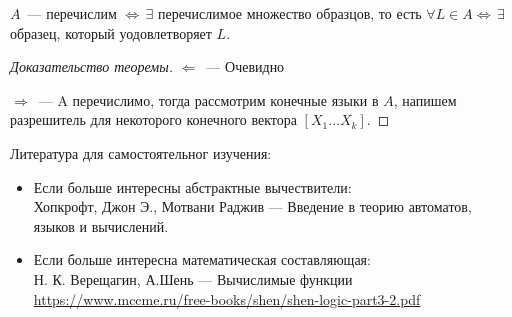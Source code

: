 \begin{theorem}
    $A$~--- перечислим $\iff \, \exists$ перечислимое множество образцов, то есть $\forall L \in A \iff \, \exists$ образец, который уодовлетворяет $L$.
\end{theorem}

\begin{proof}[Доказательство теоремы]
    $\Leftarrow $~--- Очевидно

    $\Rightarrow $~--- A перечислимо, тогда рассмотрим конечные языки в $A$, напишем разрешитель для некоторого конечного вектора $[X_1 \dots X_k]$.
\end{proof}

Литература для самостоятельног изучения:
\begin{itemize}
    \item Если больше интересны абстрактные вычествители:\\
    Хопкрофт, Джон Э., Мотвани Раджив --- Введение в теорию автоматов, языков и вычислений.
    \item Если больше интересна математическая составляющая:\\
     Н. К. Верещагин, А.Шень --- Вычислимые функции
     \url{https://www.mccme.ru/free-books/shen/shen-logic-part3-2.pdf}
\end{itemize}
